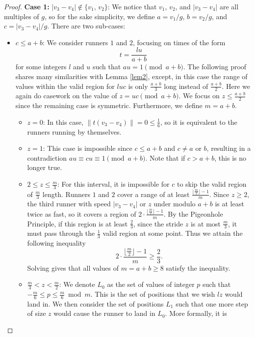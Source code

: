 \documentclass[11pt]{amsart}
\newcommand{\floor}[1]{\lfloor #1 \rfloor}
\begin{document}
\begin{proof}
    \par \textbf{Case 1:} $|v_3 - v_4| \not\in \{v_1,\, v_2\}$: We notice that $v_1$, $v_2$, and $|v_3 - v_4|$ are all multiples of $g$, so for the sake simplicity, we define $a = v_1 / g$, $b = v_2 / g$, and $c = |v_3 - v_4| / g$. There are two sub-cases:
    \begin{itemize}
        \item $c \leq a + b$: We consider runners $1$ and $2$, focusing on times of the form
        $$t = \frac{lu}{a + b}$$
        for some integers $l$ and $u$ such that $au = 1 \pmod {a + b}$. The following proof shares many similarities with Lemma \ref{lem2}, except, in this case the range of values within the valid region for $luc$ is only $\frac{a + b}{3}$ long instead of $\frac{a + b}{2}$. Here we again do casework on the value of $z = uc \pmod {a + b}$. We focus on $z \leq \frac{a + b}{2}$ since the remaining case is symmetric. Furthermore, we define $m = a + b$.
        \begin{itemize}
            \item [--] $z = 0$: In this case, $\|t(v_3 - v_4)\| = 0 \leq \frac{1}{6}$, so it is equivalent to the runners running by themselves.
            \item [--] $z = 1$: This case is impossible since $c \leq a + b$ and $c \neq a$ or $b$, resulting in a contradiction $au \equiv cu \equiv 1 \pmod{a+b}$. Note that if $c > a + b$, this is no longer true.
            \item [--] $2 \leq z \leq \frac{m}{3}$: For this interval, it is impossible for $c$ to skip the valid region of $\frac{m}{3}$ length. Runners $1$ and $2$ cover a range of at least $\frac{\floor{\frac{m}{2}} - 1}{m}$. Since $z \geq 2$, the third runner with speed $|v_3 - v_4|$ or $z$ under modulo $a + b$ is at least twice as fast, so it covers a region of $2 \cdot \frac{\floor{\frac{m}{2}} - 1}{m}$. By the Pigeonhole Principle, if this region is at least $\frac{2}{3}$, since the stride $z$ is at most $\frac{m}{3}$, it must pass through the $\frac{1}{3}$ valid region at some point. Thus we attain the following inequality
            $$2 \cdot \frac{\floor{\frac{m}{2}} - 1}{m} \geq \frac{2}{3}.$$
            Solving gives that all values of $m = a + b \geq 8$ satisfy the inequality.
            \item [--] $\frac{m}{3} < z < \frac{m}{2}$: We denote $L_0$ as the set of values of integer $p$ such that $-\frac{m}{6} \leq p \leq \frac{m}{6} \bmod m$. This is the set of positions that we wish $lz$ would land in. We then consider the set of positions $L_1$ such that one more step of size $z$ would cause the runner to land in $L_0$. More formally, it is

\end{itemize}
\end{itemize}
\end{proof}
\end{document}
